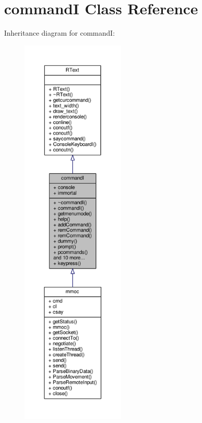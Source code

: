\hypertarget{classcommandI}{}\section{commandI Class Reference}
\label{classcommandI}


Inheritance diagram for commandI\+:
\nopagebreak
\begin{figure}[H]
\begin{center}
\leavevmode
\includegraphics[height=550pt]{d9/db3/classcommandI__inherit__graph}
\end{center}
\end{figure}


